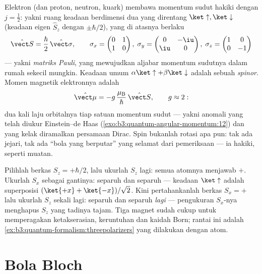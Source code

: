 \begin{definition}\label{def:b3:spin-two-level:spin}
Elektron (dan proton, neutron, kuark) membawa momentum sudut hakiki
dengan $j = \tfrac12$: yakni ruang keadaan berdimensi dua yang direntang
$\ket\uparrow, \ket\downarrow$ (keadaan eigen $\hat S_z$ dengan
$\pm\hbar/2$), yang di atasnya berlaku
\[
\hat{\vect S} = \frac\hbar2\,\hat{\vect\sigma} , \qquad
\sigma_x = \begin{pmatrix}0&1\\1&0\end{pmatrix} ,\;
\sigma_y = \begin{pmatrix}0&-\iu\\\iu&0\end{pmatrix} ,\;
\sigma_z = \begin{pmatrix}1&0\\0&-1\end{pmatrix}
\]
--- yakni \emph{matriks Pauli}, yang mewujudkan aljabar momentum
sudutnya dalam rumah sekecil mungkin. Keadaan umum
$\alpha\ket\uparrow + \beta\ket\downarrow$ adalah sebuah \emph{spinor}.
Momen magnetik elektronnya adalah
\[
\hat{\vect\mu} = -g\,\frac{\mu_{\text{B}}}{\hbar}\,\hat{\vect S} ,
\qquad g \approx 2 :
\]
dua kali laju orbitalnya tiap satuan momentum sudut --- yakni anomali
yang telah diukur Einstein--de Haas
(\cref{exo:b3:quantum-angular-momentum:12}) dan yang kelak diramalkan
persamaan Dirac. Spin bukanlah rotasi apa pun: tak ada jejari, tak ada
``bola yang berputar'' yang selamat dari pemeriksaan --- ia hakiki,
seperti muatan.
\end{definition}

\begin{example}\label{ex:b3:spin-two-level:chained}
Pilihlah berkas $S_z = +\hbar/2$, lalu ukurlah $S_z$ lagi: semua
atomnya menjawab $+$. Ukurlah $S_x$ sebagai gantinya: separuh dan
separuh --- keadaan $\ket\uparrow$ adalah superposisi
$(\ket{+x} + \ket{-x})/\sqrt2$. Kini pertahankanlah berkas $S_x = +$
lalu ukurlah $S_z$ sekali lagi: separuh dan separuh \emph{lagi} ---
pengukuran $S_x$-nya menghapus $S_z$ yang tadinya tajam. Tiga magnet
sudah cukup untuk memperagakan ketakserasian, keruntuhan dan kaidah
Born; rantai ini adalah
\cref{ex:b3:quantum-formalism:threepolarizers} yang dilakukan dengan atom.
\end{example}

\section{Bola Bloch}

